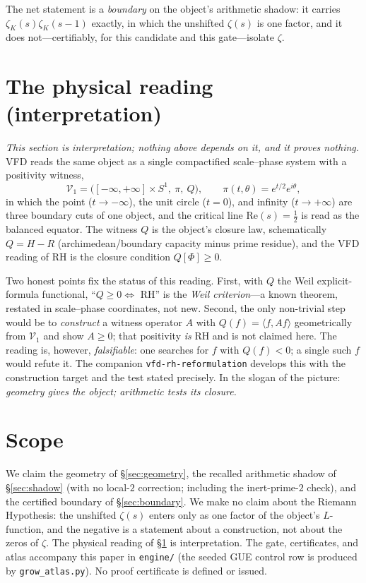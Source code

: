 \documentclass[11pt]{article}
\theoremstyle{definition}
\newcommand{\zetaK}{\zeta_{K}}
\begin{document}
The net statement is a \emph{boundary} on the object's arithmetic shadow: it carries
$\zetaK(s)\zetaK(s-1)$ exactly, in which the unshifted $\zeta(s)$ is one factor, and it
does not---certifiably, for this candidate and this gate---isolate $\zeta$.

\section{The physical reading (interpretation)}\label{sec:physics}
\emph{This section is interpretation; nothing above depends on it, and it proves nothing.}
VFD reads the same object as a single compactified scale--phase system with a positivity
witness,
\[
   \mathcal{V}_1=\bigl([-\infty,+\infty]\times S^1,\ \pi,\ Q\bigr),\qquad
   \pi(t,\theta)=e^{t/2}e^{i\theta},
\]
in which the point ($t\to-\infty$), the unit circle ($t=0$), and infinity
($t\to+\infty$) are three boundary cuts of one object, and the critical line
$\mathrm{Re}(s)=\tfrac12$ is read as the balanced equator. The witness $Q$ is the
object's closure law, schematically $Q=H-R$ (archimedean/boundary capacity minus prime
residue), and the VFD reading of RH is the closure condition $Q[\Phi]\ge0$.

Two honest points fix the status of this reading. First, with $Q$ the Weil
explicit-formula functional, ``$Q\ge0\iff$ RH'' is the \emph{Weil criterion}---a known
theorem, restated in scale--phase coordinates, not new. Second, the only non-trivial step
would be to \emph{construct} a witness operator $A$ with $Q(f)=\langle f,Af\rangle$
geometrically from $\mathcal{V}_1$ and show $A\ge0$; that positivity \emph{is} RH and is
not claimed here. The reading is, however, \emph{falsifiable}: one searches for $f$ with
$Q(f)<0$; a single such $f$ would refute it. The companion \texttt{vfd-rh-reformulation}
develops this with the construction target and the test stated precisely. In the slogan
of the picture: \emph{geometry gives the object; arithmetic tests its closure.}

\section{Scope}\label{sec:scope}
We claim the geometry of \S\ref{sec:geometry}, the recalled arithmetic shadow of
\S\ref{sec:shadow} (with no local-$2$ correction; including the inert-prime-$2$ check),
and the certified boundary of
\S\ref{sec:boundary}. We make no claim about the Riemann Hypothesis: the unshifted
$\zeta(s)$ enters only as one factor of the object's $L$-function, and the negative is a
statement about a
construction, not about the zeros of $\zeta$. The physical reading of
\S\ref{sec:physics} is interpretation. The gate, certificates, and atlas accompany this
paper in \texttt{engine/} (the seeded GUE control row is produced by
\texttt{grow\_atlas.py}). No proof certificate is defined or issued.
\end{document}
